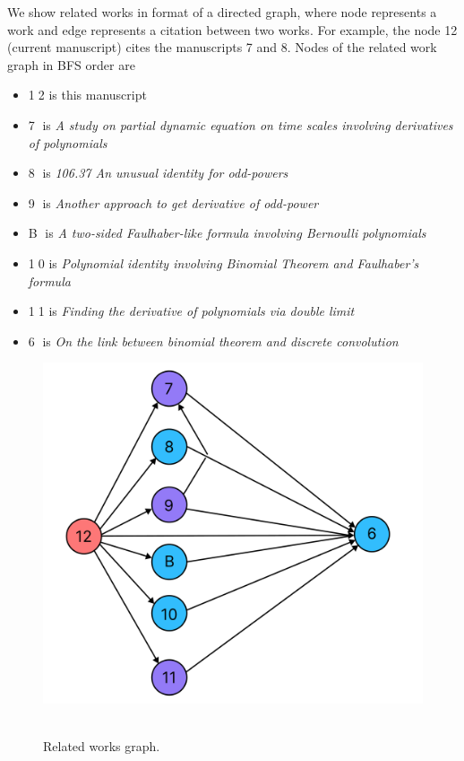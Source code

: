 We show related works in format of a directed graph, where node represents
a work and edge represents a citation between two works.
For example, the node 12 (current manuscript) cites the manuscripts 7 and 8.
Nodes of the related work graph in BFS order are
\begin{itemize}
    \item {\Large \textcircled{\normalsize 12}} is this manuscript
    \item {\Large \textcircled{\normalsize 7}} is \textit{A study on partial dynamic equation on time scales involving derivatives
    of polynomials}~\cite{study_on_partial_dynamic_eq_on_time_scales_with_poly_derivatives}
    \item {\Large \textcircled{\normalsize 8}} is \textit{106.37 An unusual identity for odd-powers}~\cite{unusual_identity_for_odd_powers}
    \item {\Large \textcircled{\normalsize 9}} is \textit{Another approach to get derivative of odd-power}~\cite{another_approach_to_get_derivative_of_odd_power}
    \item {\Large \textcircled{\normalsize B}} is \textit{A two-sided Faulhaber-like formula involving Bernoulli polynomials}~\cite{barbero2020two}
    \item {\Large \textcircled{\normalsize 10}} is \textit{Polynomial identity involving Binomial Theorem and Faulhaber's formula}~\cite{polynomial_identity_with_binomial_theorem_and_faulhabers_formula}
    \item {\Large \textcircled{\normalsize 11}} is \textit{Finding the derivative of polynomials via double limit}~\cite{derivative_of_polynomials_via_double_limit}
    \item {\Large \textcircled{\normalsize 6}} is \textit{On the link between binomial theorem and discrete convolution}~\cite{on_the_link_between_binomial_theorem_and_discrete_convolution}
\end{itemize}
\begin{figure}[H]
    \centering
    \includegraphics[width=1\textwidth]{sections/images/realated_works_graph}
    ~\caption{Related works graph.}\label{fig:related-works-graph}
\end{figure}
